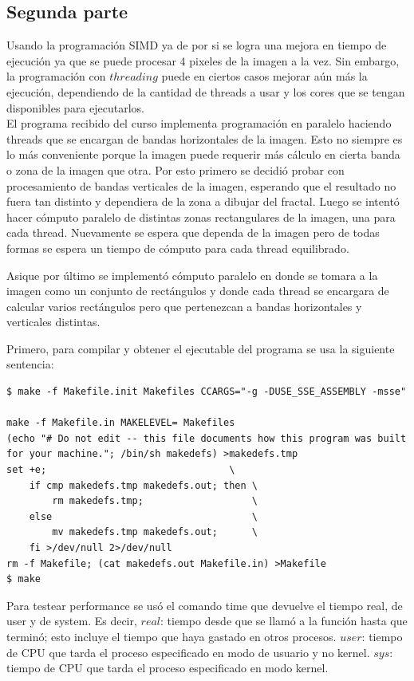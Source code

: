 \documentclass[a4paper,10pt]{article}
\begin{document}
\subsection{Segunda parte}
Usando la programación SIMD ya de por si se logra una mejora en tiempo de ejecución ya que se puede procesar 4 pixeles de la imagen a la vez. Sin embargo, la programación con $threading$ puede en ciertos casos mejorar aún más la ejecución, dependiendo de la cantidad de threads a usar y los cores que se tengan disponibles para ejecutarlos.\\
El programa recibido del curso implementa programación en paralelo haciendo threads que se encargan de bandas horizontales de la imagen. Esto no siempre es lo más conveniente porque la imagen puede requerir más cálculo en cierta banda o zona de la imagen que otra.
Por esto primero se decidió probar con procesamiento de bandas verticales de la imagen, esperando que el resultado no fuera tan distinto y dependiera de la zona a dibujar del fractal.
Luego se intentó hacer cómputo paralelo de distintas zonas rectangulares de la imagen, una para cada thread. Nuevamente se espera que dependa de la imagen pero de todas formas se espera un tiempo de cómputo para cada thread equilibrado.

Asique por último se implementó cómputo paralelo en donde se tomara a la imagen como un conjunto de rectángulos y donde cada thread se encargara de calcular varios rectángulos pero que pertenezcan a bandas horizontales y verticales distintas.


Primero, para compilar y obtener el ejecutable del programa se usa la siguiente sentencia:
\begin{verbatim}
$ make -f Makefile.init Makefiles CCARGS="-g -DUSE_SSE_ASSEMBLY -msse"

make -f Makefile.in MAKELEVEL= Makefiles
(echo "# Do not edit -- this file documents how this program was built for your machine."; /bin/sh makedefs) >makedefs.tmp
set +e;                                \
	if cmp makedefs.tmp makedefs.out; then \
	    rm makedefs.tmp;                   \
	else                                   \
	    mv makedefs.tmp makedefs.out;      \
	fi >/dev/null 2>/dev/null
rm -f Makefile; (cat makedefs.out Makefile.in) >Makefile
$ make
\end{verbatim}


Para testear performance se usó el comando time que devuelve el tiempo real, de user y de system. Es decir,
$real$: tiempo desde que se llamó a la función hasta que terminó; esto incluye el tiempo que haya gastado en otros procesos.
$user$: tiempo de CPU que tarda el proceso especificado en modo de usuario y no kernel.
$sys$: tiempo de CPU que tarda el proceso especificado en modo kernel.
\end{document}
